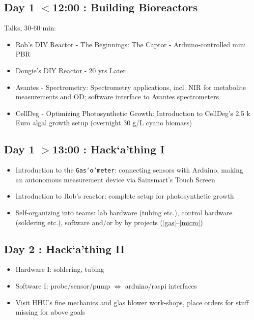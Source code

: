 \documentclass[12pt,a4paper]{scrartcl}
\newcommand{\hack}[0]{Hack`a'thing}
\newcommand{\gasometer}[0]{\texttt{Gas`o'meter}}
\begin{document}
\subsection{Day 1 $<$12:00 : Building Bioreactors}

Talks, 30-60 min:
\begin{itemize}
\item Rob's DIY Reactor - The Beginnings: The Captor -
  Arduino-controlled mini PBR
\item Dougie's DIY Reactor - 20 yrs Later
\item Avantes - Spectrometry: Spectrometry applications, incl. NIR for
  metabolite measurements and OD; software interface to Avantes
  spectrometers
\item CellDeg - Optimizing Photosynthetic Growth: Introduction to
  CellDeg's 2.5 k Euro algal growth setup (overnight 30 g/L cyano
  biomass)
\end{itemize}


\subsection{Day 1 $>$13:00 : \hack{} I}

\begin{itemize}
\item Introduction to the \gasometer{}: connecting sensors with Arduino,
  making an autonomous measurement device via Sainsmart's Touch Screen
\item Introduction to Rob's reactor: complete setup for photosynthetic growth
\item Self-organizing into teams: lab hardware (tubing etc.), control hardware
(soldering etc.), software and/or by by projects (\ref{gas}--\ref{micro}) 
\end{itemize}

\subsection{Day 2 : \hack{} II}


\begin{itemize}
\item Hardware I: soldering, tubing
\item Software I: probe/sensor/pump $\Leftrightarrow$ arduino/raspi interfaces
\item Visit HHU's fine mechanics and glas blower work-shops, place
  orders for stuff missing for above goals
\end{itemize}
\end{document}
